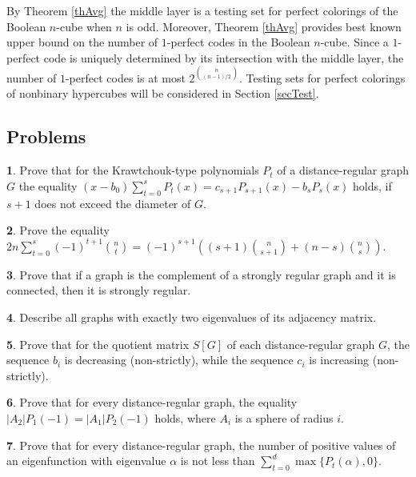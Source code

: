 \documentclass[11pt]{article}
\theoremstyle{definition}
\newtheorem{exercise}{\quad}
\begin{document}
{{By Theorem  \ref{thAvg} the middle layer  is a testing set for   perfect colorings of the Boolean $n$-cube when $n$ is odd. Moreover, Theorem
\ref{thAvg} provides best known upper bound on the number of $1$-perfect
codes in the Boolean $n$-cube. Since a $1$-perfect code is uniquely determined by its intersection with the middle layer, the number of $1$-perfect codes is at most $2^{n \choose (n-1)/2}$. Testing sets for  perfect colorings of nonbinary hypercubes will be considered in Section \ref{secTest}.


\subsection{Problems}

{\begin{exercise} Prove that for the Krawtchouk-type polynomials $P_t$ of a distance-regular graph $G$ the equality
$(x-b_0)\sum\limits_{t=0}^sP_t(x)=c_{s+1}P_{s+1}(x)-b_sP_s(x)$ holds, if
$s+1$ does not exceed the diameter of $G$.
\end{exercise}}

{\begin{exercise}\label{exer} Prove the equality\\
{ $2n\sum\limits_{t=0}^s(-1)^{t+1}{n \choose
t}=(-1)^{s+1}\left((s+1){n \choose {s+1}}+(n-s){n \choose
{s}}\right)$.}
\end{exercise}}

\begin{exercise} Prove that if a graph is the complement of a strongly regular
graph and it is connected, then it is strongly regular.
\end{exercise}

{\begin{exercise} Describe all graphs with exactly two eigenvalues
of its adjacency matrix.
\end{exercise}}



\begin{exercise}
Prove that for the quotient matrix $S[G]$ of each
distance-regular graph $G$, the sequence $b_i$ is decreasing
(non-strictly), while the sequence $c_i$ is increasing (non-strictly).
\end{exercise}



{
\begin{exercise}
Prove that for every distance-regular graph, the equality $|A_2|P_1(-1)=|A_1|P_2(-1)$ holds, where $A_i$ is a sphere of radius $i$.
\end{exercise}}
\begin{exercise}
Prove that for every distance-regular graph, the number
of positive values of an eigenfunction with eigenvalue
$\alpha$ is not less than $\sum\limits_{t=0}^d \max\{P_t(\alpha),0\}$.
\end{exercise}






}}
\end{document}

